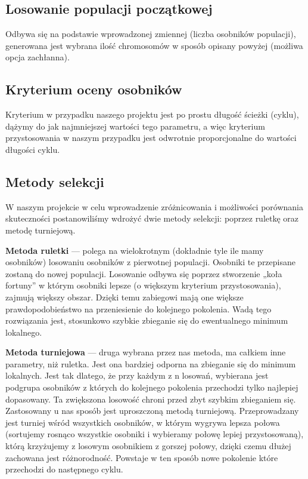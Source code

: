 \documentclass[a4paper]{article}
\begin{document}
\subsection{Losowanie populacji początkowej}
Odbywa się na podstawie wprowadzonej zmiennej (liczba osobników populacji), generowana jest wybrana ilość chromosomów w sposób opisany powyżej (możliwa opcja zachłanna).

\subsection{Kryterium oceny osobników}
Kryterium w przypadku naszego projektu jest po prostu długość ścieżki (cyklu), dążymy do jak najmniejszej wartości tego parametru, a więc kryterium przystosowania w naszym przypadku jest odwrotnie proporcjonalne do wartości długości cyklu.

\subsection{Metody selekcji}
W naszym projekcie w celu wprowadzenie zróżnicowania i możliwości porównania skuteczności postanowiliśmy wdrożyć dwie metody selekcji: poprzez ruletkę oraz metodę turniejową.

\textbf{Metoda ruletki} --- polega na wielokrotnym (dokładnie tyle ile mamy osobników) losowaniu osobników z pierwotnej populacji. Osobniki te przepisane zostaną do nowej populacji. Losowanie odbywa się poprzez stworzenie „koła fortuny” w którym osobniki lepsze (o większym kryterium przystosowania), zajmują większy obszar. Dzięki temu zabiegowi mają one większe prawdopodobieństwo na przeniesienie do kolejnego pokolenia. Wadą tego rozwiązania jest, stosunkowo szybkie zbieganie się do ewentualnego minimum lokalnego.

\textbf{Metoda turniejowa} --- druga wybrana przez nas metoda, ma całkiem inne parametry, niż ruletka. Jest ona bardziej odporna na zbieganie się do minimum lokalnych. Jest tak dlatego, że przy każdym z n losowań, wybierana jest podgrupa osobników z których do kolejnego pokolenia przechodzi tylko najlepiej dopasowany. Ta zwiększona losowość chroni przed zbyt szybkim zbieganiem się. Zastosowany u nas sposób jest uproszczoną metodą turniejową. Przeprowadzany jest turniej wśród wszystkich osobników, w którym wygrywa lepsza połowa (sortujemy rosnąco wszystkie osobniki i wybieramy połowę lepiej przystosowaną), którą krzyżujemy z losowym osobnikiem z gorszej połowy, dzięki czemu dłużej zachowana jest różnorodność. Powstaje w ten sposób nowe pokolenie które przechodzi do następnego cyklu.
\end{document}
